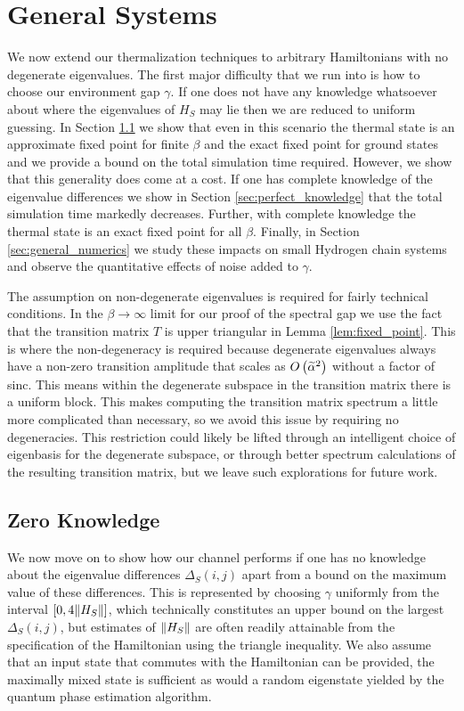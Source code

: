\section{General Systems} \label{sec:general_systems}

We now extend our thermalization techniques to arbitrary Hamiltonians with no degenerate eigenvalues. The first major difficulty that we run into is how to choose our environment gap $\gamma$. If one does not have any knowledge whatsoever about where the eigenvalues of $H_S$ may lie then we are reduced to uniform guessing. In Section \ref{sec:zero_knowledge} we show that even in this scenario the thermal state is an approximate fixed point for finite $\beta$ and the exact fixed point for ground states and we provide a bound on the total simulation time required. However, we show that this generality does come at a cost. If one has complete knowledge of the eigenvalue differences we show in Section \ref{sec:perfect_knowledge} that the total simulation time markedly decreases. Further, with complete knowledge the thermal state is an exact fixed point for all $\beta$. Finally, in Section \ref{sec:general_numerics} we study these impacts on small Hydrogen chain systems and observe the quantitative effects of noise added to $\gamma$. 

The assumption on non-degenerate eigenvalues is required for fairly technical conditions. In the $\beta \to \infty$ limit for our proof of the spectral gap we use the fact that the transition matrix $T$ is upper triangular in Lemma \ref{lem:fixed_point}. This is where the non-degeneracy is required because degenerate eigenvalues always have a non-zero transition amplitude that scales as $O\left( \widetilde{\alpha}^2 \right)$ without a factor of sinc. This means within the degenerate subspace in the transition matrix there is a uniform block. This makes computing the transition matrix spectrum a little more complicated than necessary, so we avoid this issue by requiring no degeneracies. This restriction could likely be lifted through an intelligent choice of eigenbasis for the degenerate subspace, or through better spectrum calculations of the resulting transition matrix, but we leave such explorations for future work. 



\subsection{Zero Knowledge} \label{sec:zero_knowledge}
We now move on to show how our channel performs if one has no knowledge about the eigenvalue differences $\Delta_S(i,j)$ apart from a bound on the maximum value of these differences. This is represented by choosing $\gamma$ uniformly from the interval $[0, 4 \norm{H_S}]$, which technically constitutes an upper bound on the largest $\Delta_S(i,j)$, but estimates of $\norm{H_S}$ are often readily attainable from the specification of the Hamiltonian using the triangle inequality.  We also assume that an input state that commutes with the Hamiltonian can be provided, the maximally mixed state is sufficient as would a random eigenstate yielded by the quantum phase estimation algorithm.

